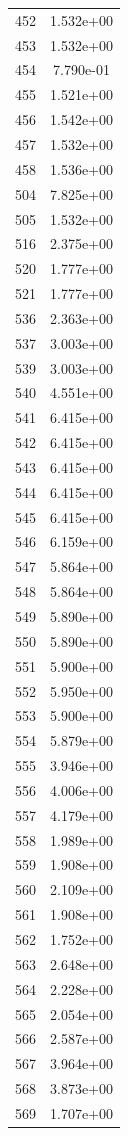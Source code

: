 \documentclass[12pt]{article}
\begin{document}
\begin{longtable}{@{}cc@{}}
452 & 1.532e+00 \\
453 & 1.532e+00 \\
454 & 7.790e-01 \\
455 & 1.521e+00 \\
456 & 1.542e+00 \\
457 & 1.532e+00 \\
458 & 1.536e+00 \\
504 & 7.825e+00 \\
505 & 1.532e+00 \\
516 & 2.375e+00 \\
520 & 1.777e+00 \\
521 & 1.777e+00 \\
536 & 2.363e+00 \\
537 & 3.003e+00 \\
539 & 3.003e+00 \\
540 & 4.551e+00 \\
541 & 6.415e+00 \\
542 & 6.415e+00 \\
543 & 6.415e+00 \\
544 & 6.415e+00 \\
545 & 6.415e+00 \\
546 & 6.159e+00 \\
547 & 5.864e+00 \\
548 & 5.864e+00 \\
549 & 5.890e+00 \\
550 & 5.890e+00 \\
551 & 5.900e+00 \\
552 & 5.950e+00 \\
553 & 5.900e+00 \\
554 & 5.879e+00 \\
555 & 3.946e+00 \\
556 & 4.006e+00 \\
557 & 4.179e+00 \\
558 & 1.989e+00 \\
559 & 1.908e+00 \\
560 & 2.109e+00 \\
561 & 1.908e+00 \\
562 & 1.752e+00 \\
563 & 2.648e+00 \\
564 & 2.228e+00 \\
565 & 2.054e+00 \\
566 & 2.587e+00 \\
567 & 3.964e+00 \\
568 & 3.873e+00 \\
569 & 1.707e+00 \\

\end{longtable}
\end{document}
